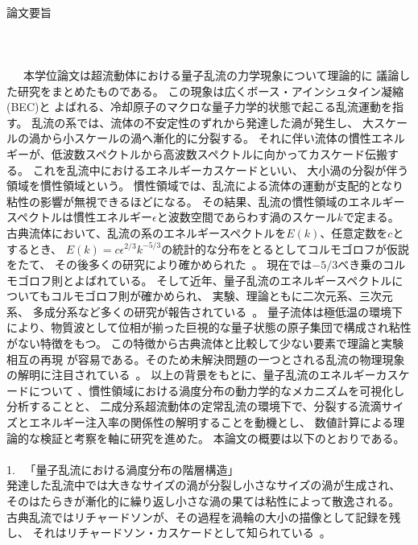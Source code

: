 \documentclass[12pt,a4paper]{jbook}
\begin{document}
	\newpage
	\ 　
	\\
	{\Huge 論文要旨}
	\\
	\\
	\\
	\\
	\ 　本学位論文は超流動体における量子乱流の力学現象について理論的に
	議論した研究をまとめたものである。
	この現象は広くボース・アインシュタイン凝縮(BEC)と
	よばれる、冷却原子のマクロな量子力学的状態で起こる乱流運動を指す。
	乱流の系では、流体の不安定性のずれから発達した渦が発生し、
    大スケールの渦から小スケールの渦へ漸化的に分裂する。
	それに伴い流体の慣性エネルギーが、低波数スペクトルから高波数スペクトルに向かってカスケード伝搬する。
	これを乱流中におけるエネルギーカスケードといい、
	大小渦の分裂が伴う領域を慣性領域という。
	慣性領域では、乱流による流体の運動が支配的となり粘性の影響が無視できるほどになる。
	その結果、乱流の慣性領域のエネルギースペクトルは慣性エネルギー$\epsilon$と波数空間であらわす渦のスケール$k$で定まる。
	古典流体において、乱流の系のエネルギースペクトルを$E(k)$、任意定数を$c$とするとき、
	$E(k)=c\epsilon^{2/3}k^{-5/3}$の統計的な分布をとるとしてコルモゴロフが仮説をたて、
    その後多くの研究により確かめられた~\cite{Kolmogorov,Batchelor,Tatsumi1,Tatsumi2,Kraichnan,Frisch1,Frisch2,Cyril}。
	現在では$-5/3$べき乗のコルモゴロフ則とよばれている。
	そして近年、量子乱流のエネルギースペクトルについてもコルモゴロフ則が確かめられ、
	実験、理論ともに二次元系、三次元系、
    多成分系など多くの研究が報告されている~\cite{Navon, Kobayashi1,Kobayashi2,Kobayashi3, Araki, paper1}。
	量子流体は極低温の環境下により、物質波として位相が揃った巨視的な量子状態の原子集団で構成され粘性がない特徴をもつ。
	この特徴から古典流体と比較して少ない要素で理論と実験相互の再現
	が容易である。そのため未解決問題の一つとされる乱流の物理現象の解明に注目されている~\cite{Ginzburg}。
	以上の背景をもとに、量子乱流のエネルギーカスケードについて
	、慣性領域における渦度分布の動力学的なメカニズムを可視化し分析することと、
    二成分系超流動体の定常乱流の環境下で、分裂する流滴サイズとエネルギー注入率の関係性の解明することを動機とし、
	数値計算による理論的な検証と考察を軸に研究を進めた。
	本論文の概要は以下のとおりである。
    \\
    \\
	1. \ 「量子乱流における渦度分布の階層構造」
    \\
	発達した乱流中では大きなサイズの渦が分裂し小さなサイズの渦が生成され、
    そのはたらきが漸化的に繰り返し小さな渦の果ては粘性によって散逸される。
    古典乱流ではリチャードソンが、その過程を渦輪の大小の描像として記録を残し、
    それはリチャードソン・カスケードとして知られている~\cite{Richardson}。
\end{document}
